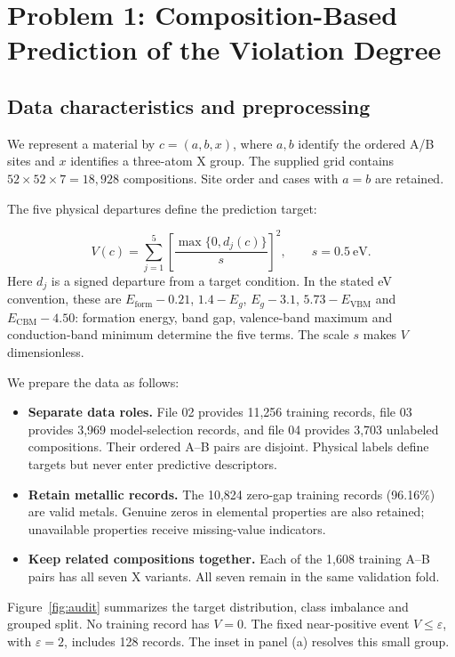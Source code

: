 \section{Problem 1: Composition-Based Prediction of the Violation Degree}
\subsection{Data characteristics and preprocessing}
We represent a material by $c=(a,b,x)$, where $a,b$ identify the ordered A/B sites and $x$ identifies a three-atom X group. The supplied grid contains $52\times52\times7=18{,}928$ compositions. Site order and cases with $a=b$ are retained.

The five physical departures define the prediction target:
\begin{samepage}
\begin{equation}
 V(c)=\sum_{j=1}^{5}\left[\frac{\max\{0,d_j(c)\}}{s}\right]^2,
 \qquad s=0.5\ \mathrm{eV}.
 \label{eq:violation}
\end{equation}
\noindent Here $d_j$ is a signed departure from a target condition. In the stated eV convention, these are $E_{\mathrm{form}}-0.21$, $1.4-E_g$, $E_g-3.1$, $5.73-E_{\mathrm{VBM}}$ and $E_{\mathrm{CBM}}-4.50$: formation energy, band gap, valence-band maximum and conduction-band minimum determine the five terms. The scale $s$ makes $V$ dimensionless.
\end{samepage}

We prepare the data as follows:
\begin{itemize}
  \item \textbf{Separate data roles.} File 02 provides 11,256 training records, file 03 provides 3,969 model-selection records, and file 04 provides 3,703 unlabeled compositions. Their ordered A--B pairs are disjoint. Physical labels define targets but never enter predictive descriptors.
  \item \textbf{Retain metallic records.} The 10,824 zero-gap training records (96.16\%) are valid metals. Genuine zeros in elemental properties are also retained; unavailable properties receive missing-value indicators.
  \item \textbf{Keep related compositions together.} Each of the 1,608 training A--B pairs has all seven X variants. All seven remain in the same validation fold.
\end{itemize}

Figure~\ref{fig:audit} summarizes the target distribution, class imbalance and grouped split. No training record has $V=0$. The fixed near-positive event $V\le\varepsilon$, with $\varepsilon=2$, includes 128 records. The inset in panel (a) resolves this small group.
\FloatBarrier

